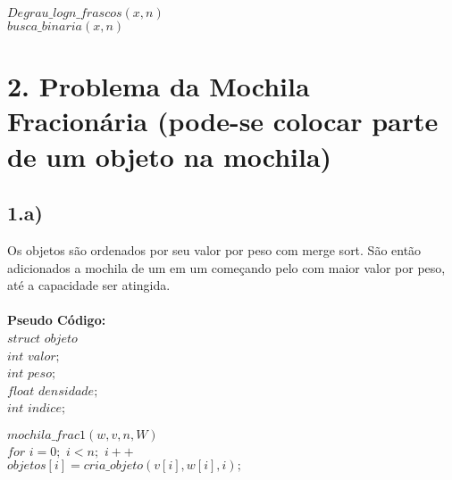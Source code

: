 \documentclass[10pt,a4paper]{article}
\begin{document}
$Degrau\_logn\_frascos(x,n)$\\
					

	\hspace{1cm}$busca\_binaria(x,n)$
	
	
	
	\section*{2. Problema da Mochila Fracionária (pode-se colocar parte de um objeto na mochila)}
	
	\vspace{1cm}
	
		\subsection*{1.a)}
		
		\vspace{0.5cm}
	
	\tab Os objetos são ordenados por seu valor por peso com merge sort. São então adicionados a mochila de um em um começando pelo com maior valor por peso, até a capacidade ser atingida.\\ \\
	
	\textbf{Pseudo Código: }\\
	
	$struct$ $objeto${\\
	
	\hspace{1cm}$int$ $valor;$\\
	
	\hspace{1cm}$int$ $peso;$\\
	
	\hspace{1cm}$float$ $densidade;$\\
	
	\hspace{1cm}$int$ $indice;$\\
	
	}

	$mochila\_frac1 (w,v,n,W)$\\

	\hspace{1cm}$for$ $i=0;$ $i<n;$ $i++$\\

	\hspace{2cm}$objetos[i] = cria\_objeto(v[i],w[i],i);$\\
	
\end{document}
